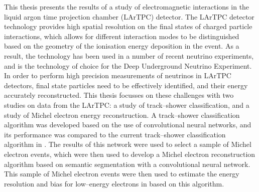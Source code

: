 This thesis presents the results of a study of electromagnetic interactions in 
the \protodune{} liquid argon time projection chamber (LArTPC) detector. The 
LArTPC detector technology provides high spatial resolution on the final states 
of charged particle interactions, which allows for different interaction modes 
to be distinguished based on the geometry of the ionisation energy deposition 
in the event. As a result, the technology has been used in a number of recent 
neutrino experiments, and is the technology of choice for the Deep Underground 
Neutrino Experiment. In order to perform high precision measurements of 
neutrinos in LArTPC detectors, final state particles need to be effectively 
identified, and their energy accurately reconstructed. This thesis focusses on 
these challenges with two studies on data from the \protodune{} LArTPC: a 
study of track--shower classification, and a study of Michel electron energy 
reconstruction. A track--shower classification algorithm was developed based 
on the use of convolutional neural networks, and its performance was compared 
to the current track--shower classification algorithm in \protodune{}. The 
results of this network were used to select a sample of Michel electron 
events, which were then used to develop a Michel electron reconstruction 
algorithm based on semantic segmentation with a convolutional neural network. 
This sample of Michel electron events were then used to estimate the energy 
resolution and bias for low--energy electrons in \protodune{} based on this 
algorithm.
